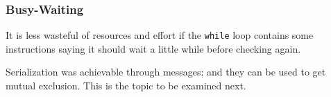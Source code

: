 \begin{frame}
	\frametitle{Busy-Waiting}

	It is less wasteful of resources and effort if the \texttt{while} loop contains some instructions saying it should wait a little while before checking again.

	Serialization was achievable through messages; and they can be used to get mutual exclusion. This is the topic to be examined next.


\end{frame}



